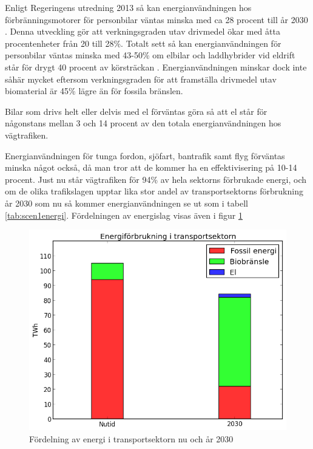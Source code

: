 \documentclass[a4paper,11pt,fleqn, titlepage]{article}
\begin{document}
Enligt Regeringens utredning 2013 så kan energianvändningen hos
förbränningsmotorer för personbilar väntas minska med ca 28 procent till år
2030 \cite{fossilfrihet}. Denna utveckling gör att verkningsgraden utav
drivmedel ökar med åtta procentenheter från 20 till 28\%.  Totalt sett så
kan energianvändningen för personbilar väntas minska med 43-50\% om elbilar
och laddhybrider vid eldrift står för drygt 40 procent av körsträckan
\cite{fossilfrihet}.  Energianvändningen minskar dock inte såhär mycket 
eftersom verkningsgraden för att framställa drivmedel utav biomaterial
är 45\% lägre än för fossila bränslen.

Bilar som drivs helt eller delvis med el förväntas göra så att el står för
någonstans mellan 3 och 14 procent av den totala energianvändningen hos
vägtrafiken.

Energianvändningen för tunga fordon, sjöfart, bantrafik samt flyg förväntas
minska något också, då man tror att de kommer ha en effektivisering på 10-14 procent.
Just nu står vägtrafiken för 94\% av hela sektorns förbrukade energi, och
om de olika trafikslagen upptar lika stor andel av transportsektorns
förbrukning år 2030 som nu så kommer energianvändningen se ut som i tabell
\ref{tab:scen1energi}. Fördelningen av energislag visas även i figur \ref{fig:scen1energifordelning}

\begin{figure}[h!]
       \centering
       \includegraphics[scale=0.7]{scen1a1transport.png}
       \caption{Fördelning av energi i transportsektorn nu och år 2030}
       \label{fig:scen1energifordelning}
\end{figure}
\end{document}

